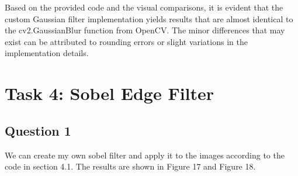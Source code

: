 \documentclass[12pt]{article}
\begin{document}
Based on the provided code and the visual comparisons, it is evident that the custom Gaussian filter implementation yields results that are almost identical to the cv2.GaussianBlur function from OpenCV. The minor differences that may exist can be attributed to rounding errors or slight variations in the implementation details.\\

\section{Task 4: Sobel Edge Filter}
\subsection{Question 1}
\quad We can create my own sobel filter and apply it to the images according to the code in section 4.1. The results are shown in Figure 17 and Figure 18.
\end{document}
